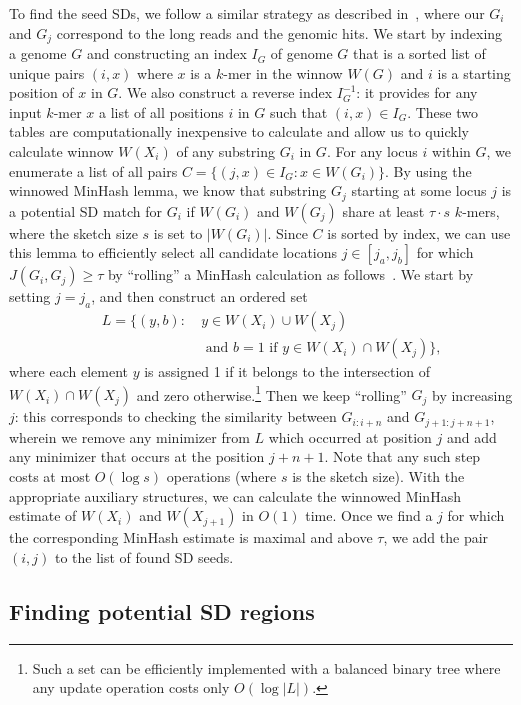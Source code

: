 \documentclass{article}
\begin{document}
To find the seed SDs, we follow a similar strategy as described in~\citep{Jain2017a}, where our $G_i$ and $G_j$ 
correspond to the long reads and the genomic hits. 
We start by indexing a genome $G$ and constructing an index $I_{G}$ of genome $G$ that is a sorted list of unique  pairs $(i, x)$ where $x$ is a $k$-mer in the winnow $W({G})$ and $i$ is a starting position of $x$ in $G$. We also construct a reverse index  $I^{-1}_{G}$: it provides for any input $k$-mer $x$ a list of all positions $i$ in $G$ such that $(i, x) \in I_{G}$. These two tables are computationally inexpensive to calculate and allow us to quickly calculate winnow $W({X}_i)$ of any substring $G_i$ in $G$. For any locus $i$ within $G$, we enumerate a list of all pairs $C=\{(j,x) \in I_G: x \in W(G_i)\}$. By using the winnowed MinHash lemma, we know that substring $G_j$ starting at some locus $j$ is a potential SD match for $G_i$ if $W(G_i)$ and $W(G_j)$ share at least $\tau \cdot s$ $k$-mers, where the sketch size $s$ is set to $|W(G_i)|$. Since $C$ is sorted by index, we can use this lemma to efficiently select all candidate locations $j\in[j_{a}, j_{b}]$ for which $J(G_i, G_j) \geq \tau$ by ``rolling'' a MinHash calculation as follows~\citep{Jain2017a}. We start by setting $j=j_a$, and then construct an ordered set  
\begin{align*}
  & & L= \{(y, b):\: & y \in W(X_i) \cup W(X_{j}) \\
  & & & \text{ and } b = 1\text{ if }y \in W(X_i) \cap W(X_j)\},  
\end{align*}
where each element $y$ is assigned 1 if it belongs to the intersection of $W(X_i) \cap W(X_j)$ and zero otherwise.\footnote{Such a set can be efficiently implemented with a balanced binary tree where any update operation costs only $O(\log |L|)$.} Then we keep ``rolling'' $G_j$ by increasing $j$: this corresponds to checking the similarity between $G_{i:i+n}$ and $G_{j+1:j+n+1}$, wherein we remove any minimizer from $L$ which occurred at position $j$ and add any minimizer that occurs at the position $j+n+1$. Note that any such step costs at most $O(\log s)$ operations (where $s$ is the sketch size). With the appropriate auxiliary structures, we can calculate the winnowed MinHash estimate of $W(X_i)$ and $W(X_{j+1})$ in $O(1)$ time. Once we find a $j$ for which the corresponding MinHash estimate is maximal and above $\tau$, we add the pair $(i,j)$ to the list of found SD seeds. 

\subsection{Finding potential SD regions} 
\end{document}
